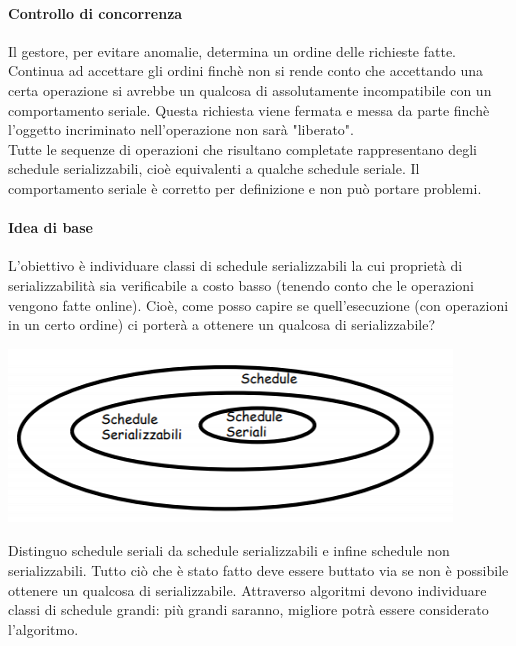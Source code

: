 \paragraph{Controllo di concorrenza} Il gestore, per evitare anomalie, determina un ordine delle richieste fatte. Continua ad accettare gli ordini finchè non si rende conto che accettando una certa operazione si avrebbe un qualcosa di assolutamente incompatibile con un comportamento seriale. Questa richiesta viene fermata e messa da parte finchè l'oggetto incriminato nell'operazione non sarà "liberato".\\

\noindent Tutte le sequenze di operazioni che risultano completate rappresentano degli schedule serializzabili, cioè equivalenti a qualche schedule seriale. Il comportamento seriale è corretto per definizione e non può portare problemi.

\paragraph{Idea di base} L'obiettivo è individuare classi di schedule serializzabili la cui proprietà di serializzabilità sia verificabile a costo basso (tenendo conto che le operazioni vengono fatte online). 
Cioè, come posso capire se quell'esecuzione (con operazioni in un certo ordine) ci porterà a ottenere un qualcosa di serializzabile?
\begin{center}
	\includegraphics{images/158.PNG}
\end{center}

Distinguo schedule seriali da schedule serializzabili e infine schedule non serializzabili. Tutto ciò che è stato fatto deve essere buttato via se non è possibile ottenere un qualcosa di serializzabile. Attraverso algoritmi devono individuare classi di schedule grandi: più grandi saranno, migliore potrà essere considerato l'algoritmo.